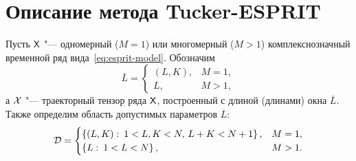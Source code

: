 \documentclass[specialist,
  substylefile = spbu.rtx,
subf,href,colorlinks=true, 12pt]{disser}
\theoremstyle{plain}
\theoremstyle{definition}
\theoremstyle{remark}
\def\tesprit/{Tucker-ESPRIT}
\begin{document}
\section{Описание метода \tesprit/}\label{sec:tesprit-description}
Пусть $\mathsf{X}$ "--- одномерный ($M=1$) или многомерный ($M>1$)
комплекснозначный временной ряд
вида~\eqref{eq:esprit-model}.
Обозначим
\[
  \overline{L} =
  \begin{cases}
    (L, K), & M=1,\\
    L, & M>1,
  \end{cases}
\]
а $\mathcal{X}$ "--- траекторный тензор ряда $\mathsf{X}$, построенный с длиной
(длинами) окна $\overline{L}$.
Также определим область допустимых параметров $\overline{L}$:
\[
  \mathcal{D} =
  \begin{cases}
    \left\{ (L, K):\: 1< L,K <N,\, L + K < N + 1 \right\}, & M = 1,\\
    \left\{ L:\: 1< L <N \right\}, & M > 1.
  \end{cases}
\]
\end{document}
